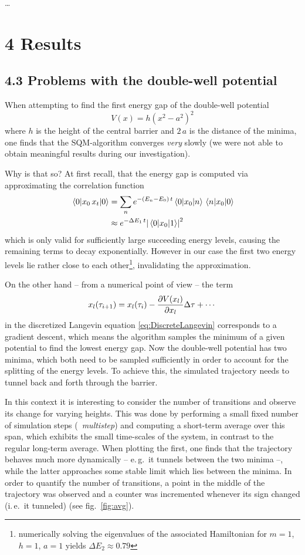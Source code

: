 \documentclass[11pt,a4paper]{scrartcl}
\newcommand*{\figref}[1]{(see fig.~\ref{#1})}
\newcommand{\eg}{e.\,g.}
\newcommand{\ie}{i.\,e.}
\begin{document}
\dots


\section*{4 Results}
\subsection*{4.3 Problems with the double-well potential}
When attempting to find the first energy gap of the double-well potential
\begin{equation}
    V(x)=h\left(x^2-a^2\right)^2
    \label{eq:double-well}
\end{equation}
where $h$ is the height of the central barrier and $2\,a$ is the distance of the
minima, one finds that the SQM-algorithm converges \emph{very} slowly (we were not
able to obtain meaningful results during our investigation).

Why is that so? At first recall, that the energy gap is computed via
approximating the correlation function
\begin{align*}
    \ev{x_0\,x_t}{0}&=\sum_{n}e^{-(E_n-E_0)\,t}\mel{0}{x_0}{n}\mel{n}{x_0}{0}
    \\&\approx{e^{-\Delta{E_1}\,t}}\abs{\mel{0}{x_0}{1}}^2
\end{align*}
which is only valid for sufficiently large succeeding energy levels, causing
the remaining terms to decay exponentially. However in our case the first two
energy levels lie rather close to each other\footnote{numerically solving the
eigenvalues of the associated Hamiltonian for $m=1$, $h=1$, $a=1$ yields
$\Delta{E_2}\approx0.79$}, invalidating the approximation.

On the other hand -- from a numerical point of view -- the term
\begin{equation*}
    x_l(\tau_{i+1})=x_l(\tau_i)-\pdv{V(x_l)}{x_l}\Delta\tau+\dotsb
\end{equation*}
in the discretized Langevin equation \eqref{eq:DiscreteLangevin}
corresponds to a gradient descent, which means the algorithm samples the
minimum of a given potential to find the lowest energy gap. Now the double-well
potential has two minima, which both need to be sampled sufficiently in order
to account for the splitting of the energy levels. To achieve this, the
simulated trajectory needs to tunnel back and forth through the barrier.

In this context it is interesting to consider the number of transitions and
observe its change for varying heights. This was done by performing a small
fixed number of simulation steps (\textrightarrow~\emph{multistep}) and
computing a short-term average over this span, which exhibits the small
time-scales of the system, in contrast to the regular long-term average. When
plotting the first, one finds that the trajectory behaves much more dynamically
-- \eg~it tunnels between the two minima --, while the latter approaches some
stable limit which lies between the minima. In order to quantify the number of
transitions, a point in the middle of the trajectory was observed and a
counter was incremented whenever its sign changed (\ie~it tunneled)
\figref{fig:avg}.
\end{document}
